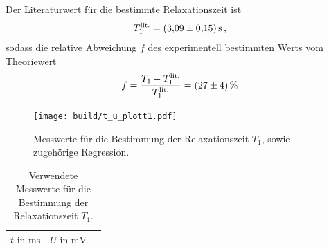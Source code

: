 Der Literaturwert\cite{litwerte} für die bestimmte Relaxationszeit ist
\begin{align*}
  T_{1}^\text{lit.} = \SI{3.09+-0.15}{\second} \, ,
\end{align*}
sodass die relative Abweichung $f$ des experimentell bestimmten Werts
vom Theoriewert
\begin{align*}
  f = \frac{T_{1} - T_{1}^\text{lit.}}{T_{1}^\text{lit.}} = \SI{27+-4}{\percent}
\end{align*}


\begin{figure}[hhh]
  \centering
  \texttt{[image: build/t\_u\_plott1.pdf]}
  \caption{Messwerte für die Bestimmung der Relaxationszeit $T_{1}$, sowie zugehörige Regression.}
  \label{fig:meiboomgill}
\end{figure}


\begin{table}
  \centering
  \caption{Verwendete Messwerte für die Bestimmung der Relaxationszeit $T_{1}$.}
  \label{tab:t1}
  \begin{tabular}{c c c}
  \toprule
  $t \text{ in } \si{\milli\second}$ & $U \text{ in } \si{\milli\volt}$\\
  \midrule
    
  \bottomrule
  \end{tabular}
\end{table}


